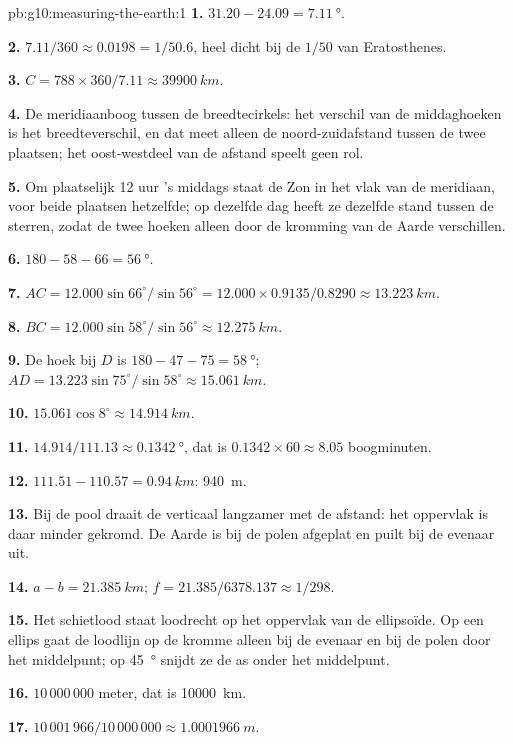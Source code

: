 \begin{solution}{pb:g10:measuring-the-earth:1}
\textbf{1.} $31.20 - 24.09 = \qty{7.11}{\degree}$.

\textbf{2.} $7.11/360 \approx 0.0198 = 1/50.6$, heel dicht bij de $1/50$ van
Eratosthenes.

\textbf{3.} $C = 788 \times 360/7.11 \approx \qty{39900}{km}$.

\textbf{4.} De meridiaanboog tussen de breedtecirkels: het verschil van de
middaghoeken is het breedteverschil, en dat meet alleen de noord-zuidafstand
tussen de twee plaatsen; het oost-westdeel van de afstand speelt geen
rol.

\textbf{5.} Om plaatselijk 12 uur 's middags staat de Zon in het vlak van de
meridiaan, voor beide plaatsen hetzelfde; op dezelfde dag heeft ze dezelfde
stand tussen de sterren, zodat de twee hoeken alleen door de kromming van de
Aarde verschillen.

\textbf{6.} $180 - 58 - 66 = \qty{56}{\degree}$.

\textbf{7.} $AC = 12.000 \sin 66^\circ/\sin 56^\circ = 12.000 \times
0.9135/0.8290 \approx \qty{13.223}{km}$.

\textbf{8.} $BC = 12.000 \sin 58^\circ/\sin 56^\circ \approx \qty{12.275}{km}$.

\textbf{9.} De hoek bij $D$ is $180 - 47 - 75 = \qty{58}{\degree}$;
$AD = 13.223 \sin 75^\circ/\sin 58^\circ \approx \qty{15.061}{km}$.

\textbf{10.} $15.061 \cos 8^\circ \approx \qty{14.914}{km}$.

\textbf{11.} $14.914/111.13 \approx \qty{0.1342}{\degree}$, dat is
$0.1342 \times 60 \approx 8.05$ boogminuten.

\textbf{12.} $111.51 - 110.57 = \qty{0.94}{km}$: \qty{940}{m}.

\textbf{13.} Bij de pool draait de verticaal langzamer met de afstand: het
oppervlak is daar minder gekromd. De Aarde is bij de polen afgeplat en puilt
bij de evenaar uit.

\textbf{14.} $a - b = \qty{21.385}{km}$; $f = 21.385/6378.137 \approx 1/298$.

\textbf{15.} Het schietlood staat loodrecht op het oppervlak van de
ellipsoïde. Op een ellips gaat de loodlijn op de kromme alleen bij de evenaar
en bij de polen door het middelpunt; op \qty{45}{\degree} snijdt ze de as
onder het middelpunt.

\textbf{16.} $10\,000\,000$ meter, dat is \qty{10000}{km}.

\textbf{17.} $10\,001\,966/10\,000\,000 \approx \qty{1.0001966}{m}$.


\end{solution}
